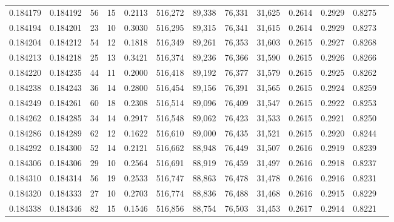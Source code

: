 \begin{tabular}{rrrrrrrrrrrrr}
0.184179 & 0.184192 &    56 &  15 &                                     0.2113 & 516,272 &  89,338 &  76,331 &  31,625 & 0.2614 & 0.2929 & 0.8275 \\
0.184194 & 0.184201 &    23 &  10 &                                     0.3030 & 516,295 &  89,315 &  76,341 &  31,615 & 0.2614 & 0.2929 & 0.8273 \\
0.184204 & 0.184212 &    54 &  12 &                                     0.1818 & 516,349 &  89,261 &  76,353 &  31,603 & 0.2615 & 0.2927 & 0.8268 \\
0.184213 & 0.184218 &    25 &  13 &                                     0.3421 & 516,374 &  89,236 &  76,366 &  31,590 & 0.2615 & 0.2926 & 0.8266 \\
0.184220 & 0.184235 &    44 &  11 &                                     0.2000 & 516,418 &  89,192 &  76,377 &  31,579 & 0.2615 & 0.2925 & 0.8262 \\
0.184238 & 0.184243 &    36 &  14 &                                     0.2800 & 516,454 &  89,156 &  76,391 &  31,565 & 0.2615 & 0.2924 & 0.8259 \\
0.184249 & 0.184261 &    60 &  18 &                                     0.2308 & 516,514 &  89,096 &  76,409 &  31,547 & 0.2615 & 0.2922 & 0.8253 \\
0.184262 & 0.184285 &    34 &  14 &                                     0.2917 & 516,548 &  89,062 &  76,423 &  31,533 & 0.2615 & 0.2921 & 0.8250 \\
0.184286 & 0.184289 &    62 &  12 &                                     0.1622 & 516,610 &  89,000 &  76,435 &  31,521 & 0.2615 & 0.2920 & 0.8244 \\
0.184292 & 0.184300 &    52 &  14 &                                     0.2121 & 516,662 &  88,948 &  76,449 &  31,507 & 0.2616 & 0.2919 & 0.8239 \\
0.184306 & 0.184306 &    29 &  10 &                                     0.2564 & 516,691 &  88,919 &  76,459 &  31,497 & 0.2616 & 0.2918 & 0.8237 \\
0.184310 & 0.184314 &    56 &  19 &                                     0.2533 & 516,747 &  88,863 &  76,478 &  31,478 & 0.2616 & 0.2916 & 0.8231 \\
0.184320 & 0.184333 &    27 &  10 &                                     0.2703 & 516,774 &  88,836 &  76,488 &  31,468 & 0.2616 & 0.2915 & 0.8229 \\
0.184338 & 0.184346 &    82 &  15 &                                     0.1546 & 516,856 &  88,754 &  76,503 &  31,453 & 0.2617 & 0.2914 & 0.8221 \\

\end{tabular}
